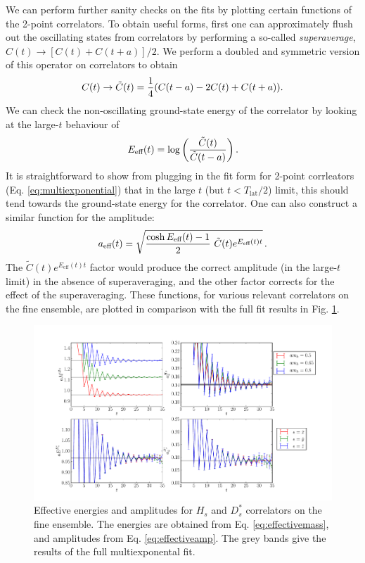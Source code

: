 We can perform further sanity checks on the fits by plotting certain functions of the 2-point correlators. To obtain useful forms, first one can approximately flush out the oscillating states from correlators by performing a so-called {\it{superaverage}}, $C(t) \to [ C(t) + C(t+a) ]/2$. We perform a doubled and symmetric version of this operator on correlators to obtain
\begin{align}
  C(t) \to \tilde{C}(t) = {1\over 4}( C(t-a) - 2C(t) + C(t+a) ).
  \label{eq:superav2}
\end{align}
We can check the non-oscillating ground-state energy of the correlator by looking at the large-$t$ behaviour of
\begin{align}
  E_{\text{eff}}(t) = \log\left({ \tilde{C}(t)\over \tilde{C}(t-a) }\right).
  \label{eq:effectivemass}
\end{align}
It is straightforward to show from plugging in the fit form for 2-point corrleators (Eq. \eqref{eq:multiexponential}) that in the large $t$ (but $t < T_{\text{lat}}/2$) limit, this should tend towards the ground-state energy for the correlator. One can also construct a similar function for the amplitude:
\begin{align}
  a_{\text{eff}}(t) = \sqrt{{\cosh E_{\text{eff}}(t)-1\over 2} \,\,\tilde{C}(t) e^{E_{\text{eff}}(t)t} }\,.
  \label{eq:effectiveamp}
\end{align}
The $\tilde{C}(t)e^{E_{\text{eff}}(t)t}$ factor would produce the correct amplitude (in the large-$t$ limit) in the absence of superaveraging, and the other factor corrects for the effect of the superaveraging. These functions, for various relevant correlators on the fine ensemble, are plotted in comparison with the full fit results in Fig. \ref{fig:2pt-summary_BsDsstar}.

\begin{figure}[htb!]
  \begin{center}
  \includegraphics[width=1.1\textwidth]{images/BsDsstar/2ptsummary_fine.pdf}
  \caption{Effective energies and amplitudes for $H_s$ and $D_s^*$ correlators on the fine ensemble. The energies are obtained from Eq. \eqref{eq:effectivemass}, and amplitudes from Eq. \eqref{eq:effectiveamp}. The grey bands give the results of the full multiexponental fit. \label{fig:2pt-summary_BsDsstar}}
  \end{center}
\end{figure}

